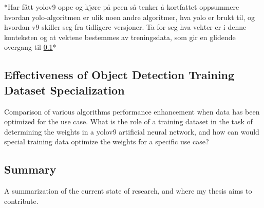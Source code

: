 *Har fått yolov9 oppe og kjøre på pcen så tenker å kortfattet oppsummere hvordan yolo-algoritmen er ulik noen andre algoritmer, hva yolo er brukt til, og hvordan v9 skiller seg fra tidligere versjoner. Ta for seg hva vekter er i denne konteksten og at vektene bestemmes av treningsdata, som gir en glidende overgang til \ref{sec:dataset_specialization}* 

\subsection{Effectiveness of Object Detection Training Dataset Specialization}
\label{sec:dataset_specialization}
Comparison of various algorithms performance enhancement when data has been optimized for the use case. What is the role of a training dataset in the task of determining the weights in a yolov9 artificial neural network, and how can would special training data optimize the weights for a specific use case?

\subsection{Summary}
A summarization of the current state of research, and where my thesis aims to contribute.